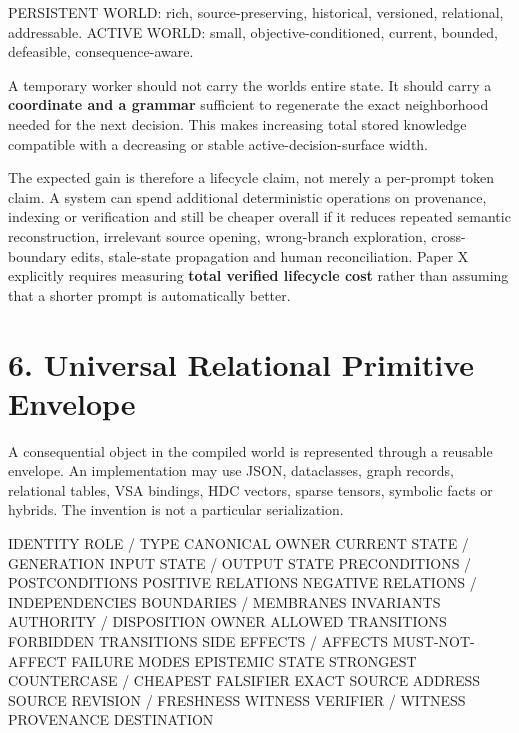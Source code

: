 \documentclass[
  10pt,
  letterpaper,
]{article}
\newenvironment{Shaded}{}{}
\newcommand{\NormalTok}[1]{#1}
\begin{document}
\begin{Shaded}
\begin{Highlighting}[]
\NormalTok{PERSISTENT WORLD: rich, source{-}preserving, historical, versioned, relational, addressable.}
\NormalTok{ACTIVE WORLD: small, objective{-}conditioned, current, bounded, defeasible, consequence{-}aware.}
\end{Highlighting}
\end{Shaded}

A temporary worker should not carry the world\textquotesingle s entire
state. It should carry a \textbf{coordinate and a grammar} sufficient to
regenerate the exact neighborhood needed for the next decision. This
makes increasing total stored knowledge compatible with a decreasing or
stable active-decision-surface width.

The expected gain is therefore a lifecycle claim, not merely a
per-prompt token claim. A system can spend additional deterministic
operations on provenance, indexing or verification and still be cheaper
overall if it reduces repeated semantic reconstruction, irrelevant
source opening, wrong-branch exploration, cross-boundary edits,
stale-state propagation and human reconciliation. Paper X explicitly
requires measuring \textbf{total verified lifecycle cost} rather than
assuming that a shorter prompt is automatically better.

\section{6. Universal Relational Primitive
Envelope}\label{6-universal-relational-primitive-envelope}

A consequential object in the compiled world is represented through a
reusable envelope. An implementation may use JSON, dataclasses, graph
records, relational tables, VSA bindings, HDC vectors, sparse tensors,
symbolic facts or hybrids. The invention is not a particular
serialization.

\begin{Shaded}
\begin{Highlighting}[]
\NormalTok{IDENTITY}
\NormalTok{ROLE / TYPE}
\NormalTok{CANONICAL OWNER}
\NormalTok{CURRENT STATE / GENERATION}
\NormalTok{INPUT STATE / OUTPUT STATE}
\NormalTok{PRECONDITIONS / POSTCONDITIONS}
\NormalTok{POSITIVE RELATIONS}
\NormalTok{NEGATIVE RELATIONS / INDEPENDENCIES}
\NormalTok{BOUNDARIES / MEMBRANES}
\NormalTok{INVARIANTS}
\NormalTok{AUTHORITY / DISPOSITION OWNER}
\NormalTok{ALLOWED TRANSITIONS}
\NormalTok{FORBIDDEN TRANSITIONS}
\NormalTok{SIDE EFFECTS / AFFECTS}
\NormalTok{MUST{-}NOT{-}AFFECT}
\NormalTok{FAILURE MODES}
\NormalTok{EPISTEMIC STATE}
\NormalTok{STRONGEST COUNTERCASE / CHEAPEST FALSIFIER}
\NormalTok{EXACT SOURCE ADDRESS}
\NormalTok{SOURCE REVISION / FRESHNESS WITNESS}
\NormalTok{VERIFIER / WITNESS}
\NormalTok{PROVENANCE DESTINATION}
\end{Highlighting}
\end{Shaded}
\end{document}
